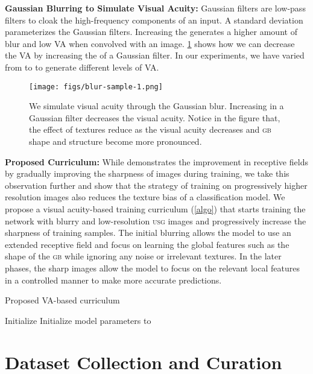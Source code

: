 \documentclass[10pt,twocolumn,letterpaper]{article}
\def\usg{\textsc{usg}\xspace}
\def\gb{\textsc{gb}\xspace}
\newcommand{\myfirstpara}[1]{\noindent \textbf{#1:}}
\newcommand{\mypara}[1]{\vspace{0.1em} \myfirstpara{#1}}
\begin{document}
\mypara{Gaussian Blurring to Simulate Visual Acuity}
Gaussian filters are low-pass filters to cloak the high-frequency components of an input. A standard deviation  parameterizes the Gaussian filters. Increasing the  generates a higher amount of blur and low VA when convolved with an image. \cref{fig:vis_acuity_sample} shows how we can decrease the VA by increasing the  of a Gaussian filter. In our experiments, we have varied  from  to  to generate different levels of VA. 
\begin{figure}[t]
	\centering
	\texttt{[image: figs/blur-sample-1.png]}
	\caption{We simulate visual acuity through the Gaussian blur. Increasing  in a Gaussian filter decreases the visual acuity. Notice in the figure that, the effect of textures reduce as the visual acuity decreases and \gb shape and structure become more pronounced.}
	\label{fig:vis_acuity_sample}
\end{figure}

\mypara{Proposed Curriculum}
While \cite{vogelsang2018VisualAcuity} demonstrates the improvement in receptive fields by gradually improving the sharpness of images during training, we take this observation further and show that the strategy of training on progressively higher resolution images also reduces the texture bias of a classification model. We propose a visual acuity-based training curriculum (\cref{algo}) that starts training the network with blurry and low-resolution \usg images and progressively increase the sharpness of training samples. The initial blurring allows the model to use an extended receptive field and focus on learning the global features such as the shape of the \gb while ignoring any noise or irrelevant textures. In the later phases, the sharp images allow the model to focus on the relevant local features in a controlled manner to make more accurate predictions. 

\begin{algorithm}[t]
\small
	\caption{Proposed VA-based curriculum}
	\label{algo}
	\SetAlgoLined
	Initialize  \;
Initialize model parameters to  \;
	
\end{algorithm}

 \section{Dataset Collection and Curation}
\end{document}
